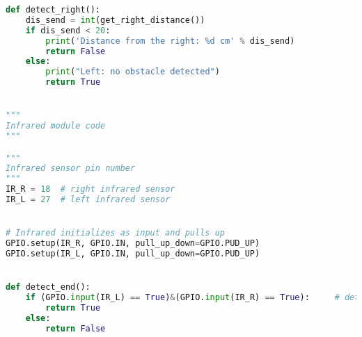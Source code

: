 \documentclass[11pt,times,oneside,openright,hardcopy]{eeereport}
\begin{document}
\begin{lstlisting}[language=Python]
def detect_right():
    dis_send = int(get_right_distance())
    if dis_send < 20:
        print('Distance from the right: %d cm' % dis_send)
        return False
    else:
        print("Left: no obstacle detected")
        return True


"""
Infrared module code
"""

"""
Infrared sensor pin number
"""
IR_R = 18  # right infrared sensor
IR_L = 27  # left infrared sensor


# Infrared initializes as input and pulls up
GPIO.setup(IR_R, GPIO.IN, pull_up_down=GPIO.PUD_UP)
GPIO.setup(IR_L, GPIO.IN, pull_up_down=GPIO.PUD_UP)


def detect_end():
    if (GPIO.input(IR_L) == True)&(GPIO.input(IR_R) == True):     # detect black on both sides.
        return True
    else:
        return False





\end{lstlisting}
\end{document}
